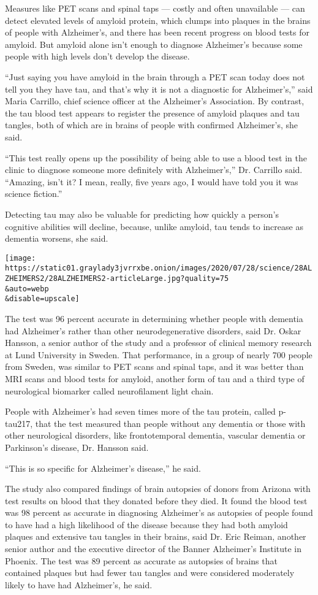 Measures like PET scans and spinal taps --- costly and often unavailable
--- can detect elevated levels of amyloid protein, which clumps into
plaques in the brains of people with Alzheimer's, and there has been
recent progress on blood tests for amyloid. But amyloid alone isn't
enough to diagnose Alzheimer's because some people with high levels
don't develop the disease.

``Just saying you have amyloid in the brain through a PET scan today
does not tell you they have tau, and that's why it is not a diagnostic
for Alzheimer's,'' said Maria Carrillo, chief science officer at the
Alzheimer's Association. By contrast, the tau blood test appears to
register the presence of amyloid plaques and tau tangles, both of which
are in brains of people with confirmed Alzheimer's, she said.

``This test really opens up the possibility of being able to use a blood
test in the clinic to diagnose someone more definitely with
Alzheimer's,'' Dr. Carrillo said. ``Amazing, isn't it? I mean, really,
five years ago, I would have told you it was science fiction.''

Detecting tau may also be valuable for predicting how quickly a person's
cognitive abilities will decline, because, unlike amyloid, tau tends to
increase as dementia worsens, she said.

\texttt{[image: https://static01.graylady3jvrrxbe.onion/images/2020/07/28/science/28ALZHEIMERS2/28ALZHEIMERS2-articleLarge.jpg?quality=75\\\&auto=webp\\\&disable=upscale]}

The test was 96 percent accurate in determining whether people with
dementia had Alzheimer's rather than other neurodegenerative disorders,
said Dr. Oskar Hansson, a senior author of the study and a professor of
clinical memory research at Lund University in Sweden. That performance,
in a group of nearly 700 people from Sweden, was similar to PET scans
and spinal taps, and it was better than MRI scans and blood tests for
amyloid, another form of tau and a third type of neurological biomarker
called neurofilament light chain.

People with Alzheimer's had seven times more of the tau protein, called
p-tau217, that the test measured than people without any dementia or
those with other neurological disorders, like frontotemporal dementia,
vascular dementia or Parkinson's disease, Dr. Hansson said.

``This is so specific for Alzheimer's disease,'' he said.

The study also compared findings of brain autopsies of donors from
Arizona with test results on blood that they donated before they died.
It found the blood test was 98 percent as accurate in diagnosing
Alzheimer's as autopsies of people found to have had a high likelihood
of the disease because they had both amyloid plaques and extensive tau
tangles in their brains, said Dr. Eric Reiman, another senior author and
the executive director of the Banner Alzheimer's Institute in Phoenix.
The test was 89 percent as accurate as autopsies of brains that
contained plaques but had fewer tau tangles and were considered
moderately likely to have had Alzheimer's, he said.

